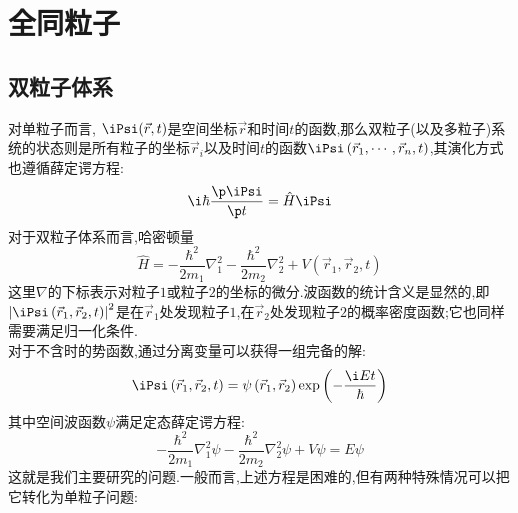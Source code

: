 \documentclass{ctexart}
\begin{document}
\section{全同粒子}
\subsection{双粒子体系}
对单粒子而言, $\iPsi(\vec{r},t)$是空间坐标$\vec{r}$和时间$t$的函数,那么双粒子(以及多粒子)系统的状态则是所有粒子的坐标$\vec{r}_i$以及时间$t$的函数$\iPsi\left(\vec{r}_1,\cdots,\vec{r}_n,t\right)$,其演化方式也遵循薛定谔方程:
\[\i\hbar\dfrac{\p\iPsi}{\p t}=\hat{H}\iPsi\]
\indent 对于双粒子体系而言,哈密顿量
\[\hat{H}=-\dfrac{\hbar^2}{2m_1}\nabla_1^2-\dfrac{\hbar^2}{2m_2}\nabla_2^2+V\left(\vec{r}_1,\vec{r}_2,t\right)\]
这里$\nabla$的下标表示对粒子$1$或粒子$2$的坐标的微分.波函数的统计含义是显然的,即$\left|\iPsi\left(\vec{r}_1,\vec{r}_2,t\right)\right|^2$是在$\vec{r}_1$处发现粒子$1$,在$\vec{r}_2$处发现粒子$2$的概率密度函数;它也同样需要满足归一化条件.\\
\indent 对于不含时的势函数,通过分离变量可以获得一组完备的解:
\[\iPsi\left(\vec{r}_1,\vec{r}_2,t\right)=\psi\left(\vec{r}_1,\vec{r}_2\right)\exp\left(-\dfrac{\i Et}{\hbar}\right)\]
其中空间波函数$\psi$满足定态薛定谔方程:
\[-\dfrac{\hbar^2}{2m_1}\nabla_1^2\psi-\dfrac{\hbar^2}{2m_2}\nabla_2^2\psi+V\psi=E\psi\]
这就是我们主要研究的问题.一般而言,上述方程是困难的,但有两种特殊情况可以把它转化为单粒子问题:
\end{document}
